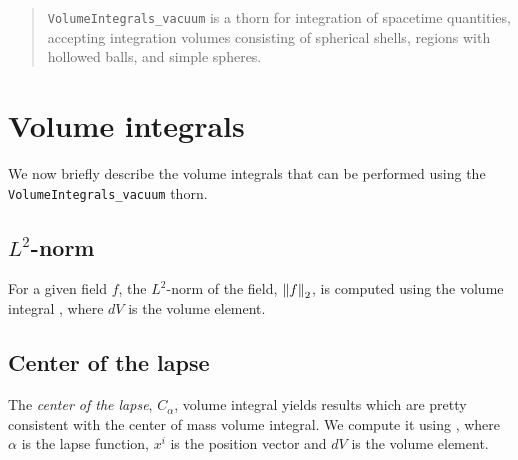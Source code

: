 \newenvironment{packed_itemize}{
\begin{itemize}
  \setlength{\itemsep}{0.0pt}
  \setlength{\parskip}{0.0pt}
  \setlength{\parsep}{ 0.0pt}
}{\end{itemize}}

\newenvironment{packed_enumerate}{
\begin{enumerate}
  \setlength{\itemsep}{0.0pt}
  \setlength{\parskip}{0.0pt}
  \setlength{\parsep}{ 0.0pt}
}{\end{enumerate}}

\begin{abstract}
  \texttt{VolumeIntegrals\_vacuum} is a thorn for integration of
  spacetime quantities, accepting integration volumes consisting of
  spherical shells, regions with hollowed balls, and simple spheres.
\end{abstract}

\section{Volume integrals}
\label{sec:volume_integrals}

We now briefly describe the volume integrals that can be performed
using the \texttt{VolumeIntegrals\_vacuum} thorn.

\subsection{$L^{2}$-norm}
\label{sec:L2_norm_integral}

For a given field $f$, the $L^{2}$-norm of the field, $\left\lVert f\right\rVert_{2}$,
is computed using the volume integral
\beq
{}\; ,
\eeq
where $dV$ is the volume element.

\subsection{Center of the lapse}
\label{sec:center_of_lapse}

The \emph{center of the lapse}, $C_{\alpha}$, volume integral yields
results which are pretty consistent with the center of mass volume
integral. We compute it using
\beq
{}\; ,
\eeq
where $\alpha$ is the lapse function, $x^{i}$ is the position vector
and $dV$ is the volume element.

